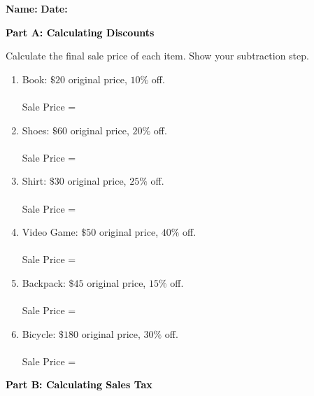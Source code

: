\documentclass[12pt, letterpaper, fleqn]{article}
\newcommand{\blanklong}{\underline{\hspace{6.5cm}}}
\begin{document}
\textbf{Name:} \underline{\hspace{5cm}}
\hfill
\textbf{Date:} \underline{\hspace{3cm}}\\

\begin{tcolorbox}[colback=black!10]
    \large\textcolor{black}{\textbf{Part A: Calculating Discounts}}
\end{tcolorbox}

\vspace{3mm}

\noindent
Calculate the final sale price of each item. Show your subtraction step.

\vspace{5mm}

\begin{enumerate}[itemsep=1cm, leftmargin=0.6cm]
\item Book: $\$20$ original price, $10\%$ off. \\ \\
Sale Price = \blanklong

\item Shoes: $\$60$ original price, $20\%$ off. \\ \\
Sale Price = \blanklong

\item Shirt: $\$30$ original price, $25\%$ off. \\ \\
Sale Price = \blanklong

\item Video Game: $\$50$ original price, $40\%$ off. \\ \\
Sale Price = \blanklong

\item Backpack: $\$45$ original price, $15\%$ off. \\ \\
Sale Price = \blanklong

\item Bicycle: $\$180$ original price, $30\%$ off. \\ \\
Sale Price = \blanklong
\end{enumerate}

\newpage

\begin{tcolorbox}[colback=black!10]
    \large\textcolor{black}{\textbf{Part B: Calculating Sales Tax}}
\end{tcolorbox}
\end{document}
